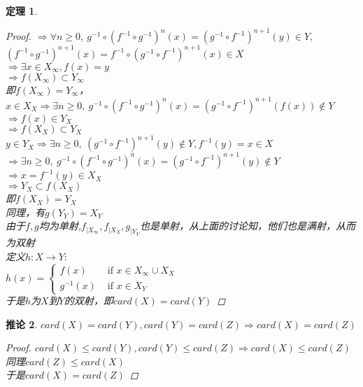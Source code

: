 \documentclass[12pt, a4paper, oneside]{ctexbook}
\newtheorem{theorem}{定理}[section]
\newtheorem{corollary}[theorem]{推论}
\begin{document}
\begin{theorem}
\begin{proof}
        $\Rightarrow \forall n\geq 0,\ g^{-1}\circ(f^{-1}\circ g^{-1})^{n}(x)=(g^{-1}\circ f^{-1})^{n+1}(y)\in Y,$\\
        $(f^{-1}\circ g^{-1})^{n+1}(x)=f^{-1}\circ (g^{-1}\circ f^{-1})^{n+1}(x)\in X$\\
        $\Rightarrow \exists x\in X_{\infty},f(x)=y$\\
        $\Rightarrow f(X_{\infty})\subset Y_{\infty}$\\
        即$f(X_{\infty})=Y_{\infty}$，\\
        $x\in X_{X}\Rightarrow \exists n\geq 0,\ g^{-1}\circ(f^{-1}\circ g^{-1})^{n}(x)=(g^{-1}\circ f^{-1})^{n+1}(f(x))\notin Y$\\
        $\Rightarrow f(x)\in Y_X$\\
        $\Rightarrow f(X_X)\subset Y_X$\\
        $y\in Y_X\Rightarrow \exists n\geq 0,\ (g^{-1}\circ f^{-1})^{n+1}(y)\notin Y,f^{-1}(y)=x\in X$\\
        $\Rightarrow \exists n\geq 0,\ g^{-1}\circ(f^{-1}\circ g^{-1})^{n}(x)=(g^{-1}\circ f^{-1})^{n+1}(y)\notin Y$\\
        $\Rightarrow x=f^{-1}(y)\in X_X$\\
        $\Rightarrow Y_X\subset f(X_X)$\\
        即$f(X_X)=Y_X$\\
        同理，有$g(Y_Y)=X_Y$\\
        由于$f,g$均为单射,$f_{|X_{\infty}},f_{|X_X},g_{|Y_Y}$也是单射，从上面的讨论知，他们也是满射，从而为双射\\
        定义$h:X\rightarrow Y:$\\
        $h(x)=\begin{cases}
            f(x)& \text{ if } x\in X_{\infty}\cup X_X \\
            g^{-1}(x)& \text{ if } x\in X_Y
          \end{cases} $\\
        于是$h$为$X$到$Y$的双射，即$card(X)=card(Y)$
    \end{proof}
\end{theorem}
\begin{corollary}
    $card(X)=card(Y),card(Y)=card(Z)\Rightarrow card(X)=card(Z)$
    \begin{proof}
        $card(X)\leq card(Y),card(Y)\leq card(Z)\Rightarrow card(X)\leq card(Z)$\\
        同理$card(Z)\leq card(X)$\\
        于是$card(X)=card(Z)$
    \end{proof}
\end{corollary}
\end{document}
